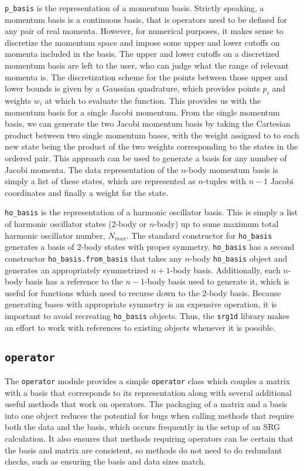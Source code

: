 \texttt{p\_basis} is the representation of a momentum basis. Strictly speaking, a momentum basis is a continuous basis, that is operators need to be defined for any pair of real momenta. However, for numerical purposes, it makes sense to discretize the momentum space and impose some upper and lower cutoffs on momenta included in the basis. The upper and lower cutoffs on a discretized momentum basis are left to the user, who can judge what the range of relevant momenta is. The discretization scheme for the points between those upper and lower bounds is given by a Gaussian quadrature, which provides points $p_i$ and weights $w_i$ at which to evaluate the function. This provides us with the momentum basis for a single Jacobi momentum. From the single momentum basis, we can generate the two Jacobi momentum basis by taking the Cartesian product between two single momentum bases, with the weight assigned to to each new state being the product of the two weights corresponding to the states in the ordered pair. This approach can be used to generate a basis for any number of Jacobi momenta. The data representation of the $n$-body momentum basis is simply a list of these states, which are represented as $n$-tuples with $n-1$ Jacobi coordinates and finally a weight for the state.

\texttt{ho\_basis} is the representation of a harmonic oscillator basis. This is simply a list of harmonic oscillator states (2-body or $n$-body) up to some maximum total harmonic oscillator number, $N_{max}$. The standard constructor for \texttt{ho\_basis} generates a basis of 2-body states with proper symmetry. \texttt{ho\_basis} has a second constructor \texttt{ho\_basis.from\_basis} that takes any $n$-body \texttt{ho\_basis} object and generates an appropriately symmetrized $n+1$-body basis. Additionally, each $n$-body basis has a reference to the $n-1$-body basis used to generate it, which is useful for functions which need to recurse down to the 2-body basis. Because generating bases with appropriate symmetry is an expensive operation, it is important to avoid recreating \texttt{ho\_basis} objects. Thus, the \texttt{srg1d} library makes an effort to work with references to existing objects whenever it is possible.

\subsection{\texttt{operator}}

The \texttt{operator} module provides a simple \texttt{operator} class which couples a matrix with a basis that corresponds to its representation along with several additional useful methods that work on operators. The packaging of a matrix and a basis into one object reduces the potential for bugs when calling methods that require both the data and the basis, which occurs frequently in the setup of an SRG calculation. It also ensures that methods requiring operators can be certain that the basis and matrix are consistent, so methods do not need to do redundant checks, such as ensuring the basis and data sizes match.

